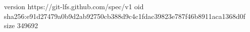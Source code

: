 version https://git-lfs.github.com/spec/v1
oid sha256:e91d27479a0b9d2ab92750cb388d9c4c1fdac39823e787f46b8911aca1368d0f
size 349692
